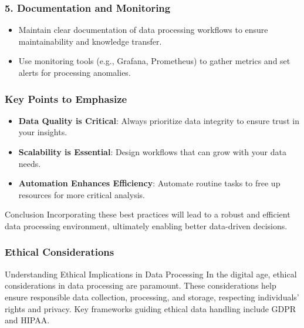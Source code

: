 \documentclass[aspectratio=169]{beamer}
\begin{document}
\begin{frame}
    \frametitle{5. Documentation and Monitoring}
    \begin{itemize}
        \item Maintain clear documentation of data processing workflows to ensure maintainability and knowledge transfer.
        \item Use monitoring tools (e.g., Grafana, Prometheus) to gather metrics and set alerts for processing anomalies.
    \end{itemize}
\end{frame}

\begin{frame}
    \frametitle{Key Points to Emphasize}
    \begin{itemize}
        \item \textbf{Data Quality is Critical}: Always prioritize data integrity to ensure trust in your insights.
        \item \textbf{Scalability is Essential}: Design workflows that can grow with your data needs.
        \item \textbf{Automation Enhances Efficiency}: Automate routine tasks to free up resources for more critical analysis.
    \end{itemize}
    \begin{block}{Conclusion}
        Incorporating these best practices will lead to a robust and efficient data processing environment, ultimately enabling better data-driven decisions.
    \end{block}
\end{frame}

\begin{frame}[fragile]
    \frametitle{Ethical Considerations}
    \begin{block}{Understanding Ethical Implications in Data Processing}
        In the digital age, ethical considerations in data processing are paramount. These considerations help ensure responsible data collection, processing, and storage, respecting individuals' rights and privacy. Key frameworks guiding ethical data handling include GDPR and HIPAA.
    \end{block}
\end{frame}
\end{document}
